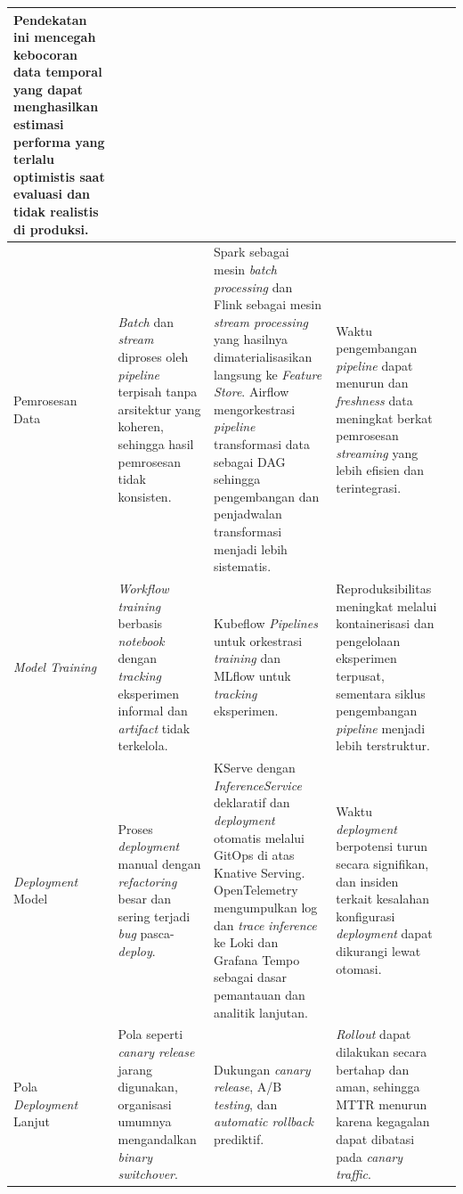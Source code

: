{\begin{longtable}{|m{2cm}|m{2.7cm}|m{2.7cm}|m{3.05cm}|m{2cm}|}
Pendekatan ini mencegah kebocoran data temporal yang dapat menghasilkan estimasi performa yang terlalu optimistis saat evaluasi dan tidak realistis di produksi. &
\autocite{polyzotis2018data} \\
\hline
Pemrosesan Data &
\textit{Batch} dan \textit{stream} diproses oleh \textit{pipeline} terpisah tanpa arsitektur yang koheren, sehingga hasil pemrosesan tidak konsisten. &
Spark sebagai mesin \textit{batch processing} dan Flink sebagai mesin \textit{stream processing} yang hasilnya dimaterialisasikan langsung ke \textit{Feature Store}. Airflow mengorkestrasi \textit{pipeline} transformasi data sebagai DAG sehingga pengembangan dan penjadwalan transformasi menjadi lebih sistematis. &
Waktu pengembangan \textit{pipeline} dapat menurun dan \textit{freshness} data meningkat berkat pemrosesan \textit{streaming} yang lebih efisien dan terintegrasi. &
\autocite{rodrigues2025architecture} \\
\hline
\textit{Model Training} &
\textit{Workflow} \textit{training} berbasis \textit{notebook} dengan \textit{tracking} eksperimen informal dan \textit{artifact} tidak terkelola. &
Kubeflow \textit{Pipelines} untuk orkestrasi \textit{training} dan MLflow untuk \textit{tracking} eksperimen. &
Reproduksibilitas meningkat melalui kontainerisasi dan pengelolaan eksperimen terpusat, sementara siklus pengembangan \textit{pipeline} menjadi lebih terstruktur. &
\autocite{amershi2019software,pimentel2019notebooks} \\
\hline
\textit{Deployment} Model &
Proses \textit{deployment} manual dengan \textit{refactoring} besar dan sering terjadi \textit{bug} pasca-\textit{deploy}. &
KServe dengan \textit{InferenceService} deklaratif dan \textit{deployment} otomatis melalui GitOps di atas Knative Serving. OpenTelemetry mengumpulkan log dan \textit{trace} \textit{inference} ke Loki dan Grafana Tempo sebagai dasar pemantauan dan analitik lanjutan. &
Waktu \textit{deployment} berpotensi turun secara signifikan, dan insiden terkait kesalahan konfigurasi \textit{deployment} dapat dikurangi lewat otomasi. &
\autocite{paleyes2022challenges} \\
\hline
Pola \textit{Deployment} Lanjut &
Pola seperti \textit{canary release} jarang digunakan, organisasi umumnya mengandalkan \textit{binary switchover}. &
Dukungan \textit{canary release}, A/B \textit{testing}, dan \textit{automatic rollback} prediktif. &
\textit{Rollout} dapat dilakukan secara bertahap dan aman, sehingga MTTR menurun karena kegagalan dapat dibatasi pada \textit{canary traffic}. &
\autocite{shankar2022operationalizing} \\

\end{longtable}}
